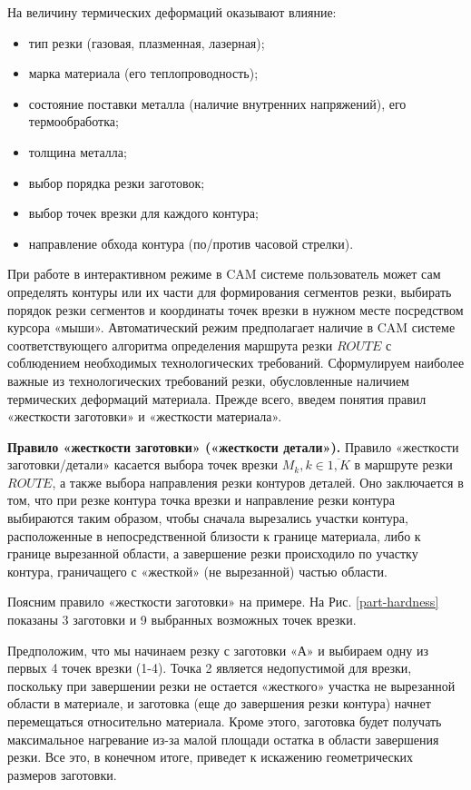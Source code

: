 \documentclass[12pt]{report}
\begin{document}
На величину термических деформаций оказывают влияние:
\begin{itemize}
\item	тип резки (газовая, плазменная, лазерная);
\item	марка материала (его теплопроводность);
\item	состояние поставки металла (наличие внутренних напряжений), его термообработка;
\item	толщина металла;
\item	выбор порядка резки заготовок;
\item	выбор точек врезки для каждого контура;
\item	направление обхода контура (по/против часовой стрелки).
\end{itemize}

При работе в интерактивном режиме в CAM системе
пользователь может сам определять контуры или их части
для формирования сегментов резки,
выбирать порядок резки сегментов и координаты точек врезки
в нужном месте посредством курсора «мыши».
Автоматический режим предполагает наличие в CAM системе
соответствующего алгоритма определения маршрута резки $ROUTE$
с соблюдением необходимых технологических требований.
Сформулируем наиболее важные из технологических требований резки,
обусловленные наличием термических деформаций материала.
Прежде всего, введем понятия правил «жесткости заготовки» и «жесткости материала».

{\bf Правило «жесткости заготовки» («жесткости детали»).}
Правило «жесткости заготовки/детали» касается выбора точек врезки
$M_k, k \in \overline{1,K}$
в маршруте резки  $ROUTE$,
а также выбора направления резки контуров деталей.
Оно заключается в том, что при резке контура точка
врезки и направление резки контура выбираются таким образом,
чтобы сначала вырезались участки контура,
расположенные в непосредственной близости к границе материала,
либо к границе вырезанной области,
а завершение резки происходило по участку контура,
граничащего с «жесткой» (не вырезанной) частью области.

Поясним правило «жесткости заготовки» на примере.
На Рис. \ref{part-hardness}
показаны 3 заготовки и 9 выбранных возможных точек врезки.

Предположим, что мы начинаем резку с заготовки «А»
и выбираем одну из первых 4 точек врезки (1-4).
Точка 2 является недопустимой для врезки,
поскольку при завершении резки не остается
«жесткого» участка не вырезанной области в материале,
и заготовка (еще до завершения резки контура)
начнет перемещаться относительно материала.
Кроме этого, заготовка будет получать максимальное
нагревание из-за малой площади остатка в области завершения резки.
Все это, в конечном итоге,
приведет к искажению геометрических размеров заготовки.
\end{document}
